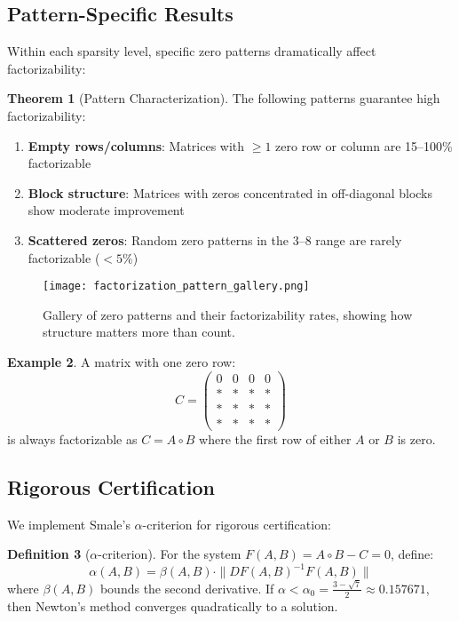 \documentclass{article}
\theoremstyle{definition}
\newtheorem{theorem}{Theorem}
\newtheorem{definition}[theorem]{Definition}
\newtheorem{example}[theorem]{Example}
\begin{document}
\subsection{Pattern-Specific Results}

Within each sparsity level, specific zero patterns dramatically affect factorizability:

\begin{theorem}[Pattern Characterization]
The following patterns guarantee high factorizability:
\begin{enumerate}
\item \textbf{Empty rows/columns}: Matrices with $\geq 1$ zero row or column are 15--100\% factorizable
\item \textbf{Block structure}: Matrices with zeros concentrated in off-diagonal blocks show moderate improvement
\item \textbf{Scattered zeros}: Random zero patterns in the 3--8 range are rarely factorizable ($<5\%$)
\end{enumerate}
\end{theorem}

\begin{figure}[h]
\centering
\texttt{[image: factorization\_pattern\_gallery.png]}
\caption{Gallery of zero patterns and their factorizability rates, showing how structure matters more than count.}
\label{fig:patterns}
\end{figure}

\begin{example}
A matrix with one zero row:
\[
C = \begin{pmatrix}
0 & 0 & 0 & 0 \\
* & * & * & * \\
* & * & * & * \\
* & * & * & *
\end{pmatrix}
\]
is always factorizable as $C = A \circ B$ where the first row of either $A$ or $B$ is zero.
\end{example}

\subsection{Rigorous Certification}

We implement Smale's $\alpha$-criterion \cite{smale1986newton} for rigorous certification:

\begin{definition}[$\alpha$-criterion]
For the system $F(A,B) = A \circ B - C = 0$, define:
\[
\alpha(A,B) = \beta(A,B) \cdot \|DF(A,B)^{-1} F(A,B)\|
\]
where $\beta(A,B)$ bounds the second derivative. If $\alpha < \alpha_0 = \frac{3 - \sqrt{7}}{2} \approx 0.157671$, then Newton's method converges quadratically to a solution.
\end{definition}
\end{document}
